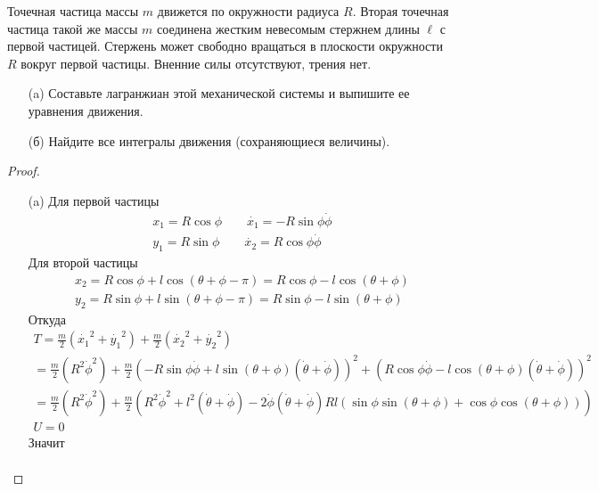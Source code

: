 \begin{prob}
Точечная частица массы $m$ движется по окружности радиуса $R$. Вторая точечная частица такой же массы $m$ соединена жестким невесомым стержнем длины $\ell$ с первой частицей. Стержень может свободно вращаться в плоскости окружности $R$ вокруг первой частицы. Вненние силы отсутствуют, трения нет.
\begin{itemize}
\item[]
\item[(a)] Составьте лагранжиан этой механической системы и выпишите ее уравнения движения.
\item[(б)] Найдите все интегралы движения (сохраняющиеся величины).
\end{itemize}
\end{prob}

\begin{proof}
\begin{itemize}
\item[]
\item[(a)] Для первой частицы
    \begin{gather*}
        x_1 = R \cos \phi\qquad \dot{x_1} = -R \sin \phi \dot{\phi}\\
        y_1 = R \sin \phi\qquad \dot{x_2} = R \cos \phi \dot{\phi}
    \end{gather*}
    Для второй частицы
    \begin{gather*}
        x_2 = R \cos \phi + l \cos (\theta + \phi - \pi)
        = R \cos \phi - l \cos(\theta + \phi)\\
        y_2 = R \sin \phi + l \sin (\theta + \phi - \pi)
        = R \sin \phi - l \sin(\theta + \phi)
    \end{gather*}
    Откуда
    \begin{gather*}
        T = \frac{m}{2}(\dot{x_1}^2 + \dot{y_1}^2) + \frac{m}{2}(\dot{x_2}^2 + \dot{y_2}^2)\\
        = \frac{m}{2}(R^2 \dot{\phi}^2) + \frac{m}{2}(-R \sin \phi \dot{\phi} + l \sin (\theta + \phi)(\dot{\theta} + \dot{\phi}))^2
        + (R \cos \phi \dot{\phi} - l \cos (\theta + \phi)(\dot{\theta} + \dot{\phi}))^2\\
        = \frac{m}{2}(R^2 \dot{\phi}^2) + \frac{m}{2}(R^2 \dot{\phi}^2 + l^2(\dot{\theta} + \dot{\phi}) - 2\dot{\phi}(\dot{\theta} + \dot{\phi}) R l (\sin \phi \sin(\theta + \phi) + \cos \phi \cos(\theta + \phi)))\\
        U = 0
    \end{gather*}
    Значит
    \begin{gather*}

\end{gather*}
\end{itemize}
\end{proof}
